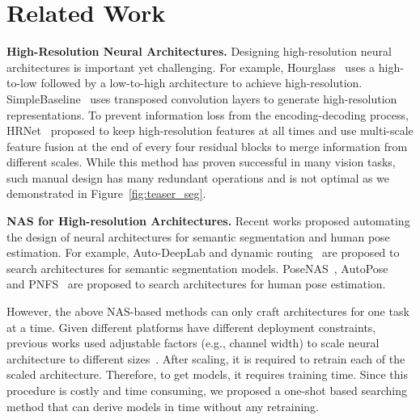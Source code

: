 \documentclass[final]{cvpr}
\begin{document}
 \section{Related Work}
\noindent\textbf{High-Resolution Neural Architectures.}
Designing high-resolution neural architectures is important yet challenging. For example, 
Hourglass~\cite{newell2016stacked} uses a high-to-low followed by a low-to-high architecture to achieve high-resolution.
SimpleBaseline~\cite{xiao2018simple} uses transposed convolution layers to generate high-resolution representations. 
To prevent information loss from the encoding-decoding process, HRNet~\cite{wang2020deep} proposed to keep high-resolution features at all times and use multi-scale feature fusion at the end of every four residual blocks to merge information from different scales. While this method has proven successful in many vision tasks, such manual design has many redundant operations and is not optimal as we demonstrated in Figure~\ref{fig:teaser_seg}. 

\noindent\textbf{NAS for High-resolution Architectures.}
Recent  works proposed automating the design of neural architectures for semantic segmentation and human pose estimation. For example, 
Auto-DeepLab and dynamic routing~\cite{li2020learning} are proposed to search architectures for semantic segmentation models. 
PoseNAS~\cite{bao2020pose}, AutoPose~\cite{gong2020autopose} and PNFS~\cite{yang2019pose} are proposed to search architectures for human pose estimation.

However, the above NAS-based methods can only craft architectures for one task at a time. Given different platforms have different deployment constraints, previous works used adjustable factors (e.g., channel width) to scale neural architecture to different sizes~\cite{wang2020deep}. After scaling, it is required to retrain each of the scaled architecture. Therefore, to get  models, it requires  training time. 
Since this procedure is costly and time consuming, we proposed a one-shot based searching method that can derive  models in  time without any retraining. 
 
\end{document}
